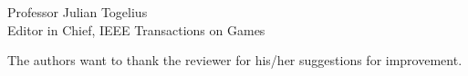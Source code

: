 \documentclass[10pt]{letter} %
\begin{document}
\begin{letter}{Professor Julian Togelius \\ Editor in Chief, IEEE Transactions on Games}
\begin{enumerate}
The authors want to thank the reviewer for his/her suggestions for improvement.


\end{enumerate}
 


\end{letter}
\end{document}

